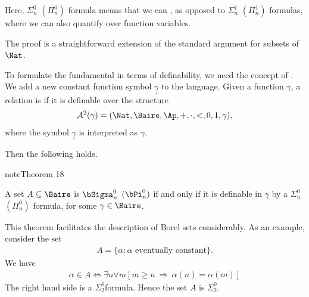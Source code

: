 \documentclass[letterpaper,10pt,english]{jupyterBook}
\begin{document}
\sphinxAtStartPar
Here, \(\Sigma^0_n\) \((\Pi^0_n)\) formula means that we can , as opposed to \(\Sigma^1_n\) \((\Pi^1_n)\) formulas, where we can also quantify over function variables.

\sphinxAtStartPar
The proof is a straightforward extension of the standard argument for subsets of \(\Nat\).

\sphinxAtStartPar
To formulate the fundamental {\hyperref[\detokenize{codingBorel:thm-fundamental}]{}} in terms of definability, we need the concept of . We add a new constant function symbol \(\underline{\gamma}\) to the language. Given a function \(\gamma\), a relation is
 if it is definable over the structure
\begin{equation*}
\begin{split}
\mathcal{A}^2(\gamma) = (\Nat, \Baire, \Ap, +, \cdot, <, 0, 1, \gamma),
\end{split}
\end{equation*}
\sphinxAtStartPar
where the symbol \(\underline{\gamma}\) is interpreted as \(\gamma\).

\sphinxAtStartPar
Then the following holds.
\label{codingBorel:thm-Borel-arith}
\begin{sphinxadmonition}{note}{Theorem 18}



\sphinxAtStartPar
A set \(A \subseteq \Baire\) is \(\bSigma^0_n\) \((\bPi^0_n)\) if and only if it is definable in \(\gamma\) by a \(\Sigma^0_n\) \((\Pi^0_n)\) formula, for some \(\gamma \in \Baire\).
\end{sphinxadmonition}

\sphinxAtStartPar
This theorem facilitates the description of Borel sets considerably. As an example, consider the set
\begin{equation*}
\begin{split}
	A = \{ \alpha \colon \text{$\alpha$ eventually constant} \}.
\end{split}
\end{equation*}
\sphinxAtStartPar
We have
\begin{equation*}
\begin{split}
	\alpha \in A \iff \exists n \forall m [ m \geq n \: \Rightarrow \: \alpha(n) = \alpha(m) ]
\end{split}
\end{equation*}
\sphinxAtStartPar
The right hand side is a \(\Sigma^0_2\)\sphinxhyphen{}formula. Hence the set \(A\) is \(\Sigma^0_2\).
\end{document}
